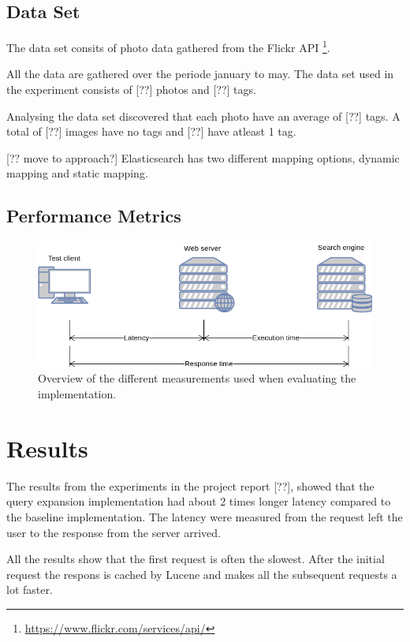 \subsection{Data Set}
\label{sec:dataset}
The data set consits of photo data gathered from the Flickr API \footnote{\url{https://www.flickr.com/services/api/}}.

All the data are gathered over the periode january to may.
The data set used in the experiment consists of [??] photos and [??] tags.

Analysing the data set discovered that each photo have an average of [??] tags.
A total of [??] images have no tags and [??] have atleast 1 tag.

[?? move to approach?]
Elasticsearch has two different mapping options, dynamic mapping and static mapping.


\subsection{Performance Metrics}

\begin{figure}[h!]
\centering \includegraphics[width=0.9\linewidth]{img/latency-measurements.png}
\caption{Overview of the different measurements used when evaluating the implementation.}
\label{fig:latency-measurements}
\end{figure}

\section{Results}
\label{sec:results}
The results from the experiments in the project report [??],
showed that the query expansion implementation had about 2 times longer latency compared to the baseline implementation.
The latency were measured from the request left the user to the response from the server arrived.

All the results show that the first request is often the slowest.
After the initial request the respons is cached by Lucene and makes all the subsequent requests a lot faster.

